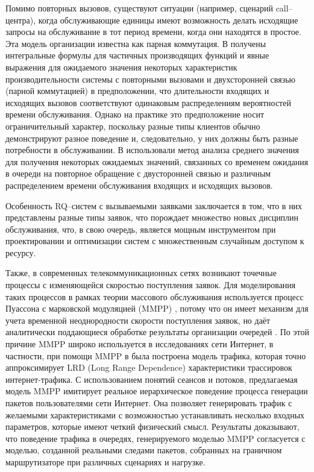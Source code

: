 Помимо повторных вызовов, существуют ситуации (например, сценарий call--центра), когда обслуживающие единицы имеют возможность делать исходящие запросы на обслуживание в тот период времени, когда они находятся в простое. Эта модель организации известна как парная коммутация. В \cite{falin1979model} получены интегральные формулы для частичных производящих функций и явные выражения для ожидаемого значения некоторых характеристик производительности системы с повторными вызовами и двухсторонней связью (парной коммутацией) в предположении, что длительности входящих и исходящих вызовов соответствуют одинаковым распределениям вероятностей времени обслуживания. Однако на практике это предположение носит ограничительный характер, поскольку разные типы клиентов обычно демонстрируют разное поведение и, следовательно, у них должны быть разные потребности в обслуживании. В \cite{artalejo2010mean} использовали метод анализа среднего значения для получения некоторых ожидаемых значений, связанных со временем ожидания в очереди на повторное обращение с двусторонней связью и различным распределением времени обслуживания входящих и исходящих вызовов.

Особенность RQ--систем с вызываемыми заявками заключается в том, что в них представлены разные типы заявок, что порождает множество новых дисциплин обслуживания, что, в свою очередь, является мощным инструментом при проектировании и оптимизации систем с множественным случайным доступом к ресурсу.

Также, в современных телекоммуникационных сетях возникают точечные процессы с изменяющейся скоростью поступления заявок. Для моделирования таких процессов в рамках теории массового обслуживания используется процесс Пуассона с марковской модуляцией (MMPP) \cite{baiocchi1993steady,2019asymptotic}, потому что он имеет механизм для учета временной неоднородности скорости поступления заявок, но даёт аналитически поддающиеся обработке результаты организации очередей \cite{meier1987fitting}. По этой причине MMPP широко используется в исследованиях сети Интернет, в частности, при помощи MMPP в  \cite{muscariello2004mmpp} была построена модель трафика, которая точно аппроксимирует LRD (Long Range Dependence) характеристики трассировок интернет-трафика. С использованием понятий сеансов и потоков, предлагаемая модель MMPP имитирует реальное иерархическое поведение процесса генерации пакетов пользователями сети Интернет. Она позволяет генерировать трафик с желаемыми характеристиками с возможностью устанавливать несколько входных параметров, которые имеют четкий физический смысл. Результаты доказывают, что поведение трафика в очередях, генерируемого моделью MMPP согласуется с моделью, созданной реальными следами пакетов, собранных на граничном маршрутизаторе при различных сценариях и нагрузке.

